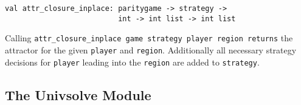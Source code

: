 \begin{description}
\item
\begin{verbatim}
val attr_closure_inplace: paritygame -> strategy ->
                          int -> int list -> int list
\end{verbatim}
Calling \verb+attr_closure_inplace game strategy player region returns+ the attractor for the given \verb+player+
and \verb+region+. Additionally all necessary strategy decisions for \verb+player+ leading into the \verb+region+
are added to \verb+strategy+.

\end{description}


\subsection{The {\ttfamily Univsolve} Module}

